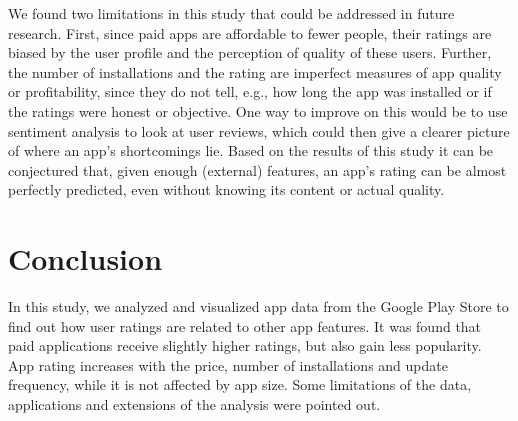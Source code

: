 \documentclass{article}
\begin{document}
We found two limitations in this study that could be addressed in future research. First, since paid apps are affordable to fewer people, their ratings are biased by the user profile and the perception of quality of these users. Further, the number of installations and the rating are imperfect measures of app quality or profitability, since they do not tell, e.g., how long the app was installed or if the ratings were honest or objective. One way to improve on this would be to use sentiment analysis to look at user reviews, which could then give a clearer picture of where an app's shortcomings lie. Based on the results of this study it can be conjectured that, given enough (external) features, an app's rating can be almost perfectly predicted, even without knowing its content or actual quality.

\section{Conclusion}

In this study, we analyzed and visualized app data from the Google Play Store to find out how user ratings are related to other app features. It was found that paid applications receive slightly higher ratings, but also gain less popularity. App rating increases with the price, number of installations and update frequency, while it is not affected by app size. Some limitations of the data, applications and extensions of the analysis were pointed out.

\appendix
\printbibliography
\end{document}
